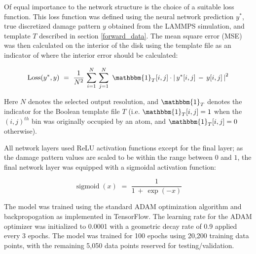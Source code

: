 Of equal importance to the network structure is the choice of a suitable loss function.  %
This loss function was defined using the neural network prediction $y^*$, true discretized damage pattern $y$ obtained from the LAMMPS simulation, and template $T$ described in section \ref{forward_data}.
The mean square error (MSE) was then calculated on the interior of the disk using the template file as an indicator of where the interior error should be calculated:

\[
\operatorname{Loss}(y^*, y) \, \, = \, \, \frac{1}{N^2} \, \sum_{i=1}^N \, \sum_{j=1}^N \, \, \mathbbm{1}_{T}[i,j] \cdot \left| \, y^*[i,j] \, - \, y[i,j]  \, \right|^2
\]


Here $N$ denotes the selected output resolution, and $\mathbbm{1}_T$ denotes the indicator for the Boolean template file $T$  (i.e. $\mathbbm{1}_{T}[i,j]=1$ when the $(i,j)^{th}$ bin was originally occupied by an atom, and $\mathbbm{1}_{T}[i,j]=0$ otherwise).


All network layers used ReLU activation functions except for the final layer; as the damage pattern values are scaled to be within the range between $0$ and $1$, the final network layer was equipped with a sigmoidal activation function:


\[
\operatorname{sigmoid}(x) \, \, = \, \, \frac{1}{1 \, + \, \exp(-x)}
\]

The model was trained using the standard ADAM optimization algorithm and backpropogation as implemented in TensorFlow.  The learning rate for the ADAM optimizer was initialized to 0.0001 with a geometric decay rate of 0.9 applied every 3 epochs.  The model was trained for 100 epochs using 20,200 training data points, with the remaining 5,050 data points reserved for testing/validation.  



